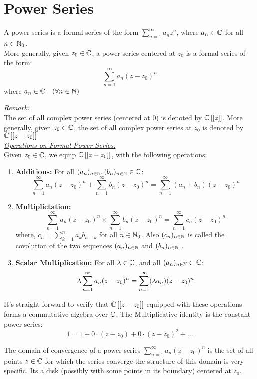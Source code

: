 \chapter{Power Series}

\begin{definition}
  A power series is a formal series of the form 
  $\sum_{n=1}^{\infty} a_{n}z^{n} $, where $a_{n} \in  \mathbb{C} $ for all
  $n \in \mathbb{N}_0$. \\
  More generally, given $z_0 \in \mathbb{C}  $, a power series 
  centered at  $z_0 $ is a formal series of the form: 
  \[
  \sum_{n=1}^{\infty} a_{n}(z-z_0) ^{n}
  \]
  where $a_{n} \in \mathbb{C}  \quad (\forall n \in \mathbb{N})  $ 
\end{definition}
\noindent\underline{\emph{Remark:}} \\
  The set of all complex power series 
  (centered at $0 $) is denoted by 
  $\mathbb{C} \left[ [z] \right] $. More generally, given
  $z_0 \in  \mathbb{C}  $, the set of all complex power series
  at $z_0 $ is denoted by $\mathbb{C} 
  \left[ [z-z_0] \right]
  $ 
  \\
\underline{\emph{Operations on Formal Power Series:}} \\
Given $z_0 \in  \mathbb{C}  $, we equip $\mathbb{C} \left[ \left[ z-z_0 \right] \right] $,
with the following operations: 
\begin{enumerate}
\item \textbf{Additions:} For all $(a_{n}) _{n \in \mathbb{N}}, (b_{n}) _{n \in \mathbb{N}} \in  \mathbb{C}$:
  \[
  \sum_{n=1}^{\infty} a_{n}(z-z_0) ^n + \sum_{n=1}^{\infty} b_{n}(z-z_0) ^n = 
  \sum_{n=1}^{\infty} (a_{n} + b_n ) (z-z_0) ^n 
  \]
\item \textbf{Multiplictation:} 
  \[
  \sum_{n=1}^{\infty} a_{n}(z-z_0) ^n  \times \sum_{n=1}^{\infty} 
  b_n (z-z_0) ^n = 
  \sum_{n=1}^{\infty} c_{n} (z-z_0) ^n 
  \]
  where, $c _n = \sum_{k=1}^{n} a_{k} b_{n-k} $  for all $n \in \mathbb{N}_0 $.
  Also $(c_{n}) _{n \in \mathbb{N}} $ is called the covolution of the two sequences
  $(a_{n}) _{n \in \mathbb{N}} $ and $(b_{n}) _{n \in \mathbb{N}} $ .
 \item 
   \textbf{Scalar Multiplication:} For all $\lambda \in  \mathbb{C}  $, and all $(a_{n}) _{n \in \mathbb{N}} \subset   \mathbb{C}  $:
   \begin{align*}
   \lambda \sum_{n=1}^{\infty} a_{n}(z-z_0) ^n  = 
   \sum_{n=1}^{\infty} (\lambda a _n ) (z-z_0) ^n 
   \end{align*}
\end{enumerate}
It's straight forward to verify that $\mathbb{C} \left[ \left[ z-z_0 \right] \right] $  equipped with these operations 
forms a commutative algebra over $\mathbb{C}  $. The Multiplicative identity is the constant power series:
\[
1 = 1 + 0 \cdot ( z-z_0)  + 0 \cdot (z-z_0) ^2 + \hdots 
\]
\begin{definition}
The domain of convergence of a power series 
$\sum_{n=1}^{\infty} a_n (z-z_0) ^n  $ is the set of all points $z \in  \mathbb{C}  $ for which 
the series converge the structure of this domain is very specific. Its a disk (possibly with 
some points in its boundary) centered at $z_0$.
\end{definition}

